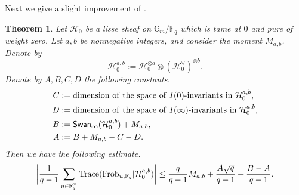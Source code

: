 \documentclass[11pt]{amsart}
\theoremstyle{plain}
\newtheorem{thm}{Theorem}
\theoremstyle{definition}
\numberwithin{thm}{section}
\numberwithin{equation}{thm}
\newcommand{\Trace}{{\rm Trace}}
\newcommand{\Swan}{\mathsf {Swan}}
\newcommand{\sH}{{\mathcal H}}
\newcommand{\F}{{\mathbb F}}
\newcommand{\G}{{\mathbb G}}
\newcommand{\0}{\emptyset}
\newcommand{\Frob}{\mathrm{Frob}}
\begin{document}
Next we give a slight improvement of \cite[Theorem 6.5]{Ka-RL-T-spor}.
\begin{thm}\label{Mab}Let $\sH_0$ be a lisse sheaf on $\G_m/\F_q$ which is tame at $0$ and pure of weight zero.
Let $a,b$ be nonnegative integers, and consider the moment $M_{a,b}$.
Denote by
$$\sH_0^{a,b}:=\sH_0^{\otimes a}\otimes (\sH_0^\vee)^{\otimes b}.$$
Denote by $A,B,C,D$ the following constants.
$$\begin{aligned}C &:={\rm dimension\ of\ the\ space\ of\ }I(0)\mbox{-\rm{invariants\ in\ }}\sH_0^{a,b},\\
   D&:={\rm dimension\ of\ the\ space\ of\ }I(\infty)\mbox{-\rm{invariants\ in\ }}\sH_0^{a,b},\\
  B & :=\Swan_\infty(\sH_0^{a,b}) +M_{a,b},\\
  A & :=B+M_{a,b}-C-D.\end{aligned}$$
Then we have the following estimate.
$$\biggl{|}\frac{1}{q-1}\sum_{u \in \F_q^\times}\Trace(\Frob_{u,\F_q}|\sH_0^{a,b})\biggr{|} \le \frac{q}{q-1}M_{a,b} + \frac{A\sqrt{q}}{q-1} +\frac{B-A}{q-1}.$$
\end{thm}
\end{document}
